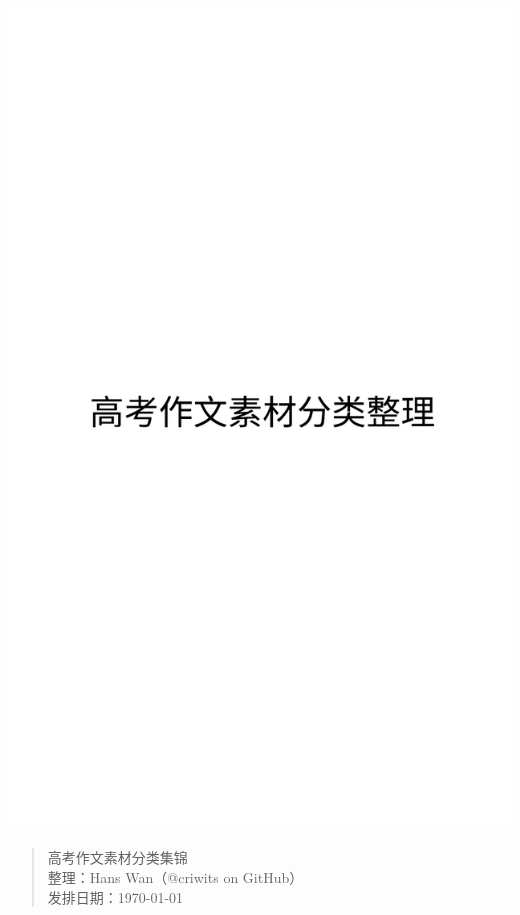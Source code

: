 \thispagestyle{empty}
\includegraphics{cover}

\newpage\thispagestyle{empty}
\begin{quote}
高考作文素材分类集锦\\
整理：Hans Wan（@criwits on GitHub）\\
发排日期：\today
\end{quote}

